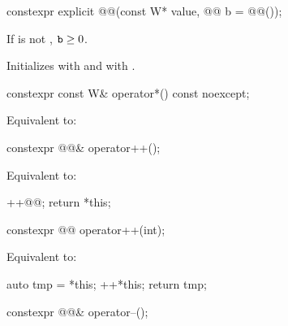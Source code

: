 %
\begin{itemdecl}
constexpr explicit @@(const W* value, @@ b = @@());
\end{itemdecl}

\begin{itemdescr}
\pnum
\expects
If  is not , $\texttt{b} \ge 0$.

\pnum
\effects
Initializes  with  and
 with .
\end{itemdescr}

%
\begin{itemdecl}
constexpr const W& operator*() const noexcept;
\end{itemdecl}

\begin{itemdescr}
\pnum
\effects
Equivalent to: 
\end{itemdescr}

%
\begin{itemdecl}
constexpr @@& operator++();
\end{itemdecl}

\begin{itemdescr}
\pnum
\effects
Equivalent to:
\begin{codeblock}
++@@;
return *this;
\end{codeblock}
\end{itemdescr}

%
\begin{itemdecl}
constexpr @@ operator++(int);
\end{itemdecl}

\begin{itemdescr}
\pnum
\effects
Equivalent to:
\begin{codeblock}
auto tmp = *this;
++*this;
return tmp;
\end{codeblock}
\end{itemdescr}

%
\begin{itemdecl}
constexpr @@& operator--();
\end{itemdecl}

